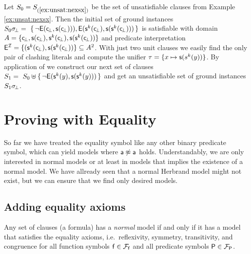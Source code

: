 \begin{example}\label{ex:unsat2}
Let $S_0 = S_{(\ref{ex:unsat:nexsx})}$ be the set of unsatisfiable clauses from Example \ref{ex:unsat:nexsx}. 
Then the initial set of ground instances 
$S_0\sigma\!_\bot =\
\{\,
{ \lnot{\mathsf E}({\mathsf c}\!_\bot, {\mathsf s}({\mathsf c}\!_\bot)))}, 
{ {\mathsf E}({\mathsf s}^k({\mathsf c}\!_\bot), {\mathsf s}({\mathsf s}^k({\mathsf c}\!_\bot)))}
\,\}$
is satisfiable with domain $A = \{ {\mathsf c}\!_\bot, {\mathsf s}({\mathsf c}\!_\bot), {\mathsf s}^k({\mathsf c}\!_\bot), {\mathsf s}({\mathsf s}^k({\mathsf c}\!_\bot)) \}$
and predicate interpretation 
${\mathsf E}^{\mathcal I} = \{ ({\mathsf s}^k({\mathsf c}\!_\bot), {\mathsf s}({\mathsf s}^k({\mathsf c}\!_\bot))
 \} \subseteq A^2$. 
% 
 With just two unit clauses we easily find the only pair of clashing literals and compute the unifier
 $\tau = \{ x\mapsto {\mathsf s}(s^k(y)) \}$. 
 By application of \InstGen we construct our next set of clauses
$
S_1 =\
S_0 \uplus
 \{\,
 { \lnot{\mathsf E}({\mathsf s}^k(y), {\mathsf s}({\mathsf s}^k(y)))}
 \,\}
 $ 
 and get an unsatisfiable set of ground instances $S_1\sigma\!_\bot$.
\end{example}




\section{Proving with Equality}\label{sec:proving:with:equality}

So far we have treated the equality symbol like any other binary predicate symbol, 
which can yield models where ${\mathsf a}\not\approx{\mathsf a}$ holds. 
Understandably, we are only interested in normal models or 
at least in models that implies the existence of a normal model.
We have allready seen that a normal Herbrand model might not exist,
but we can ensure that we find only desired models.

\subsection{Adding equality axioms}\label{sec:equality:axioms}

\begin{theorem}\cite{Harrison:2009:HPL:1540610}
	Any set of clauses (a formula) has a \emph{normal} model 
	if and only if it has a model that satisfies the 
	{\myem equality axioms}, i.e.~reflexivity, symmetry, transitivity, 
	and congruence for all function symbols ${\mathsf f}\in{{\mathcal F}_{\mathsf f}}$
	and all predicate symbols ${\mathsf P}\in{{\mathcal F}_{\mathsf P}}$.
\end{theorem}


